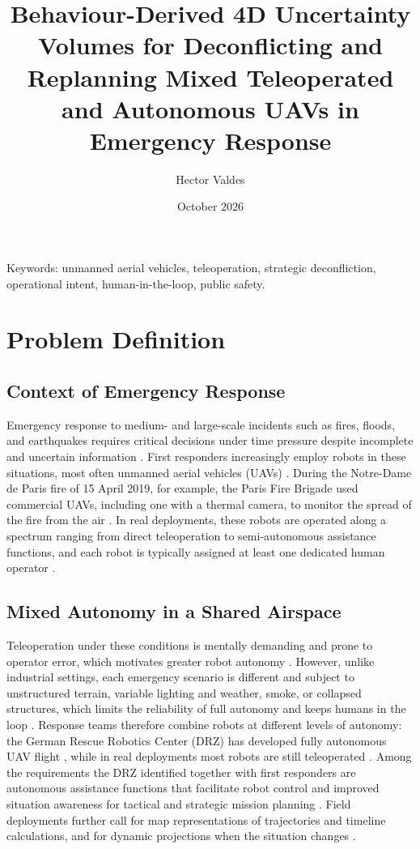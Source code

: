 \documentclass{article}
\title{Behaviour-Derived 4D Uncertainty Volumes for Deconflicting and Replanning Mixed Teleoperated and Autonomous UAVs in Emergency Response}
\author{Hector Valdes}
\date{October 2026}
\begin{document}
\maketitle

Keywords:
unmanned aerial vehicles, teleoperation, strategic deconfliction, operational intent, human-in-the-loop, public safety.

\section{Problem Definition}

\subsection{Context of Emergency Response}
Emergency response to medium- and large-scale incidents such as fires, floods, and earthquakes requires critical decisions under time pressure despite incomplete and uncertain information \cite{kruijff2021}.
First responders increasingly employ robots in these situations, most often unmanned aerial vehicles (UAVs) \cite{kruijff2021, delmerico2019}.
During the Notre-Dame de Paris fire of 15 April 2019, for example, the Paris Fire Brigade used commercial UAVs, including one with a thermal camera, to monitor the spread of the fire from the air \cite{nardi2019, peskoeyang2019}.
In real deployments, these robots are operated along a spectrum ranging from direct teleoperation to semi-autonomous assistance functions, and each robot is typically assigned at least one dedicated human operator \cite{surmann2024}.

\subsection{Mixed Autonomy in a Shared Airspace}
Teleoperation under these conditions is mentally demanding and prone to operator error, which motivates greater robot autonomy \cite{kruijff2021}.
However, unlike industrial settings, each emergency scenario is different and subject to unstructured terrain, variable lighting and weather, smoke, or collapsed structures, which limits the reliability of full autonomy and keeps humans in the loop \cite{kruijff2021, surmann2024, queralta2020}.
Response teams therefore combine robots at different levels of autonomy: the German Rescue Robotics Center (DRZ) has developed fully autonomous UAV flight \cite{kruijff2021}, while in real deployments most robots are still teleoperated \cite{surmann2024}.
Among the requirements the DRZ identified together with first responders are autonomous assistance functions that facilitate robot control and improved situation awareness for tactical and strategic mission planning \cite{kruijff2021}.
Field deployments further call for map representations of trajectories and timeline calculations, and for dynamic projections when the situation changes \cite{surmann2024}.
\end{document}

